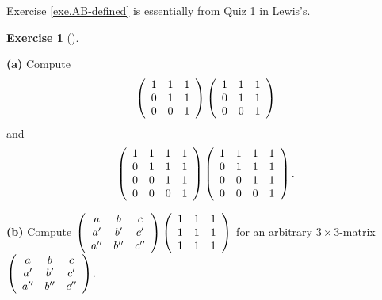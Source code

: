 \documentclass[numbers=enddot,12pt,final,onecolumn,notitlepage]{scrartcl}%
\theoremstyle{definition}
\newtheorem{exmp}[theo]{Exercise}
\newenvironment{exercise}[1][]
{\begin{exmp}[#1]\begin{leftbar}}
{\end{leftbar}\end{exmp}}
\newenvironment{noncompile}{}{}
\begin{document}
\begin{noncompile}
Exercise \ref{exe.AB-defined} is essentially from Quiz 1 in Lewis's.
\end{noncompile}

\begin{exercise}
\label{exe.some-prods}\textbf{(a)} Compute%
\[
\left(
\begin{array}
[c]{ccc}%
1 & 1 & 1\\
0 & 1 & 1\\
0 & 0 & 1
\end{array}
\right)  \left(
\begin{array}
[c]{ccc}%
1 & 1 & 1\\
0 & 1 & 1\\
0 & 0 & 1
\end{array}
\right)
\]
and%
\[
\left(
\begin{array}
[c]{cccc}%
1 & 1 & 1 & 1\\
0 & 1 & 1 & 1\\
0 & 0 & 1 & 1\\
0 & 0 & 0 & 1
\end{array}
\right)  \left(
\begin{array}
[c]{cccc}%
1 & 1 & 1 & 1\\
0 & 1 & 1 & 1\\
0 & 0 & 1 & 1\\
0 & 0 & 0 & 1
\end{array}
\right)  .
\]


\textbf{(b)} Compute $\left(
\begin{array}
[c]{ccc}%
a & b & c\\
a^{\prime} & b^{\prime} & c^{\prime}\\
a^{\prime\prime} & b^{\prime\prime} & c^{\prime\prime}%
\end{array}
\right)  \left(
\begin{array}
[c]{ccc}%
1 & 1 & 1\\
1 & 1 & 1\\
1 & 1 & 1
\end{array}
\right)  $ for an arbitrary $3\times3$-matrix $\left(
\begin{array}
[c]{ccc}%
a & b & c\\
a^{\prime} & b^{\prime} & c^{\prime}\\
a^{\prime\prime} & b^{\prime\prime} & c^{\prime\prime}%
\end{array}
\right)  $.


\end{exercise}
\end{document}
